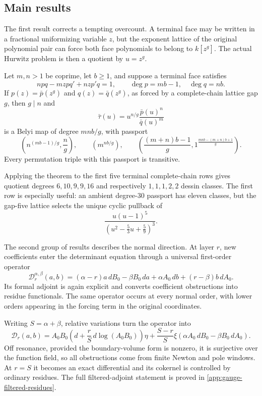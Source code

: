 \documentclass[11pt,reqno]{amsart}
\begin{document}
\subsection{Main results}

The first result corrects a tempting overcount.  A terminal face may be
written in a fractional uniformizing variable \(z\), but the exponent
lattice of the original polynomial pair can force both face polynomials to
belong to \(k[z^g]\).  The actual Hurwitz problem is then a quotient by
\(u=z^g\).

\begin{theorem}
\label{thm:intro-primary}
Let \(m,n>1\) be coprime, let \(b\ge1\), and suppose a terminal face satisfies
\[
npq-mzpq'+nzp'q=1,\qquad
\deg p=mb-1,\quad \deg q=nb.
\]
If \(p(z)=\bar p(z^g)\) and \(q(z)=\bar q(z^g)\), as forced by a
complete-chain lattice gap \(g\), then \(g\mid n\) and
\[
\bar\tau(u)=u^{n/g}\frac{\bar p(u)^n}{\bar q(u)^m}
\]
is a Belyi map of degree \(mnb/g\), with passport
\[
\left(n^{(mb-1)/g},\frac ng\right),\qquad
\left(m^{nb/g}\right),\qquad
\left(\frac{(m+n)b-1}{g},
1^{\frac{mnb-(m+n)b+1}{g}}\right).
\]
Every permutation triple with this passport is transitive.
\end{theorem}

Applying the theorem to the first five terminal complete-chain rows gives
quotient degrees \(6,10,9,9,16\) and respectively \(1,1,1,2,2\) dessin
classes.  The first row is especially useful: an ambient degree-\(30\)
passport has eleven classes, but the gap-five lattice selects the unique
cyclic pullback of
\[
\frac{u(u-1)^5}{(u^2-\frac53u+\frac59)^3}.
\]

The second group of results describes the normal direction.  At layer \(r\), new
coefficients enter the determinant equation through a universal first-order
operator
\[
\mathscr D_r^{\alpha,\beta}(a,b)
=(\alpha-r)a\,dB_0-\beta B_0\,da
+\alpha A_0\,db+(r-\beta)b\,dA_0.
\]
Its formal adjoint is again explicit and converts coefficient obstructions
into residue functionals.  The same operator occurs at every normal order,
with lower orders appearing in the forcing term in the original
coordinates.

Writing \(S=\alpha+\beta\), relative variations turn the operator into
\[
\mathscr D_r(a,b)
=A_0B_0\left(d+\frac rS\,d\log(A_0B_0)\right)\eta
+\frac{S-r}{S}\xi
\left(\alpha A_0\,dB_0-\beta B_0\,dA_0\right).
\]
Off resonance, provided the boundary-volume form is nonzero, it is
surjective over the function field, so all obstructions come from finite
Newton and pole windows.  At \(r=S\) it becomes an exact differential and
its cokernel is controlled by ordinary residues.  The full filtered-adjoint
statement is proved in
\cref{app:gauge-filtered-residues}.
\end{document}
